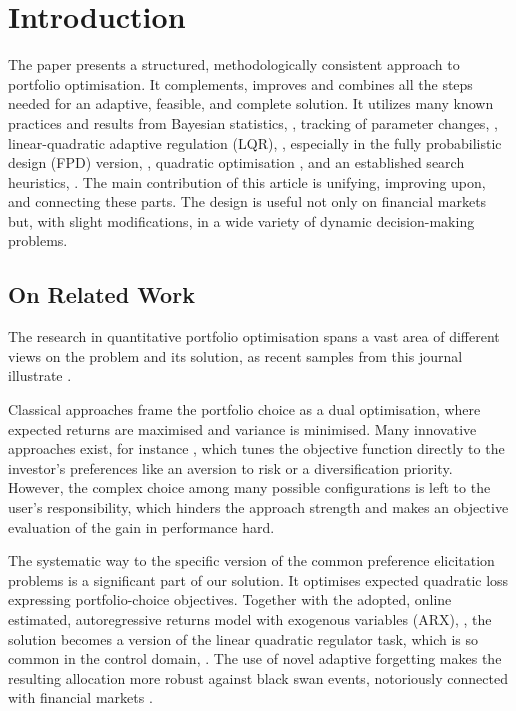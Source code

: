 \section{Introduction} \label{s:introduction}
The paper presents a structured, methodologically consistent approach to portfolio optimisation. It complements, improves and combines all the steps needed for an adaptive, feasible, and complete solution. It utilizes many known practices and results from Bayesian statistics, \cite{Pet:81,KarKul:88,Kar:25a}, tracking of parameter changes, \cite{Kul:93a}, linear-quadratic adaptive regulation (LQR), \cite{AstWit:94}, especially in the fully probabilistic design (FPD) version, \cite{Kar:19}, quadratic optimisation \cite{dostal2009optimal},  and an established search heuristics, \cite{haldurai2016study}. The main contribution of this article is unifying, improving upon, and connecting these parts. The design is useful not only on financial markets but, with slight modifications, in a wide variety of dynamic decision-making problems.

\subsection*{On Related Work}

The research in quantitative portfolio optimisation spans a vast area of different views on the problem and its solution, as recent samples from this journal illustrate \cite{BenLeaPue:25,LiGaoShu:26,LyuWuGuoGuChi:24}.

Classical approaches \cite{michaud1989markowitz} frame the portfolio choice as a dual optimisation, where expected returns are maximised and variance is minimised. Many innovative approaches exist, for instance \cite{abbracciavento2025model}, which tunes the objective function directly to the investor's preferences like an aversion to risk or a diversification priority. However, the complex choice among many possible configurations is left to the user's responsibility, which hinders the approach strength and makes an objective evaluation of the gain in performance hard.

The systematic way to the specific version of the common preference elicitation problems \cite{ChePu:04} is a significant part of our solution. It optimises expected quadratic loss expressing portfolio-choice objectives. Together with the adopted, online estimated, autoregressive returns model with exogenous variables  (ARX), \cite{Pet:81}, the solution becomes a version of the linear quadratic regulator task, which is so common in the control domain, \cite{LQRPSOOptKalmanfilter}. The use of novel adaptive forgetting \cite{Kar:25} makes the resulting allocation more robust against black swan events, notoriously connected with financial markets \cite{bogle2008black}.

